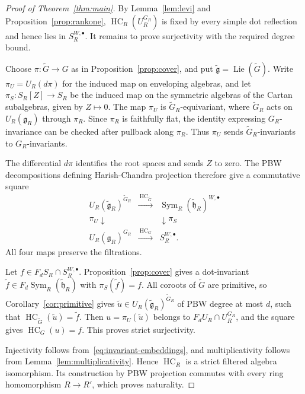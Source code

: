 \documentclass[twoside,a4paper,12pt,reqno]{amsart}
\theoremstyle{remark}
\numberwithin{equation}{section}
\newcommand{\fg}{\mathfrak g}
\newcommand{\fh}{\mathfrak h}
\DeclareMathOperator{\Sym}{Sym}
\DeclareMathOperator{\Lie}{Lie}
\DeclareMathOperator{\HC}{HC}
\begin{document}
\begin{proof}[Proof of Theorem~\ref{thm:main}]
By Lemma~\ref{lem:levi} and Proposition~\ref{prop:rankone},
\(\HC_R(U_R^{G_R})\) is fixed by every simple dot reflection and
hence lies in \(S_R^{W,\bullet}\). It remains to prove surjectivity
with the required degree bound.

Choose \(\pi:\widetilde G\to G\) as in Proposition~\ref{prop:cover},
and put \(\widetilde{\fg}=\Lie(\widetilde G)\).
Write \(\pi_U=U_R(d\pi)\) for the induced map on enveloping algebras,
and let \(\pi_S:S_R[Z]\to S_R\) be the induced map on the symmetric
algebras of the Cartan subalgebras, given by \(Z\mapsto0\).
The map \(\pi_U\) is \(\widetilde G_R\)-equivariant, where
\(\widetilde G_R\) acts on \(U_R(\fg_R)\) through \(\pi_R\).
Since \(\pi_R\) is faithfully flat, the identity expressing
\(G_R\)-invariance can be checked after pullback along \(\pi_R\).
Thus \(\pi_U\) sends \(\widetilde G_R\)-invariants to \(G_R\)-invariants.

The differential \(d\pi\) identifies the root spaces and sends \(Z\)
to zero. The PBW decompositions defining Harish-Chandra projection
therefore give a commutative square
\[
\begin{array}{ccc}
U_R(\widetilde{\fg}_R)^{\widetilde G_R}
&\xrightarrow{\ \HC_{\widetilde G}\ }&
\Sym_R(\widetilde{\fh}_R)^{W,\bullet}\\
{\scriptstyle\pi_U}\downarrow && \downarrow{\scriptstyle\pi_S}\\
U_R(\fg_R)^{G_R}
&\xrightarrow{\ \HC_G\ }& S_R^{W,\bullet}.
\end{array}
\]
All four maps preserve the filtrations.

Let \(f\in F_dS_R\cap S_R^{W,\bullet}\).
Proposition~\ref{prop:cover} gives a dot-invariant
\(\widetilde f\in F_d\Sym_R(\widetilde{\fh}_R)\) with
\(\pi_S(\widetilde f)=f\).
All coroots of \(\widetilde G\) are primitive, so
Corollary~\ref{cor:primitive} gives
\(\widetilde u\in U_R(\widetilde{\fg}_R)^{\widetilde G_R}\)
of PBW degree at most \(d\), such that
\(\HC_{\widetilde G}(\widetilde u)=\widetilde f\).
Then \(u=\pi_U(\widetilde u)\) belongs to \(F_dU_R\cap U_R^{G_R}\),
and the square gives \(\HC_G(u)=f\). This proves strict surjectivity.

Injectivity follows from~\eqref{eq:invariant-embeddings}, and
multiplicativity follows from Lemma~\ref{lem:multiplicativity}.
Hence \(\HC_R\) is a strict filtered algebra isomorphism.
Its construction by PBW projection commutes with every ring
homomorphism \(R\to R'\), which proves naturality.
\end{proof}
\end{document}
